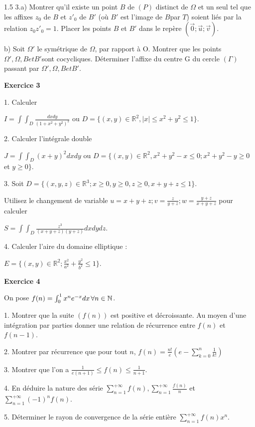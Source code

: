 \documentclass[12pt]{article}
\begin{document}
\begin{spacing}{1.5}
3.a) Montrer qu'il existe un point $B$ de $(P)$ distinct de $\Omega$ et un seul 
tel que les affixes $z_0$ de $B$ et $z'_0$ de $B'$ (où $B'$ est l'image de $B $par $T$) soient liés par la relation $z_0z'_0 = 1$. Placer les points $B$ et $B'$ dans le repère $(\overrightarrow{0} ; \overrightarrow{u}; \overrightarrow{v})$. 

b) Soit $\Omega'$ le symétrique de $\Omega$, par rapport à O. Montrer que les points $\Omega',\Omega,B et B' $sont cocycliques. 
Déterminer l'affixe du centre G du cercle $(\Gamma)$ passant par $\Omega', \Omega, B et B'$. 

\medskip\textbf{Exercice 3 }

1. Calculer

$I=\int\int_D\frac{dxdy}{(1+x^2+y^2)^2}$ ou $D=\lbrace {(x,y) \in \mathbb{R}^2,\vert x\vert \leq x^2+y^2\leq 1\rbrace}$.

2. Calculer l'intégrale double

$J=\int\int_D(x+y)^2dxdy$ ou $D=\lbrace (x,y)\in \mathbb{R}^2, x^2+y^2-x \leq 0;x^2+y^2-y \geq 0$ et $y \geq 0 \rbrace$.

3. Soit $D=\lbrace (x,y,z)\in \mathbb{R}^3;x\geq 0,y\geq 0,z\geq 0,x+y+z\leq 1 \rbrace$.

Utilisez le changement de variable $u=x+y+z; v=\frac{z}{y+z}; w=\frac{y+z}{x+y+z}$ pour calculer

$S=\int\int_D\frac{z^3}{(x+y+z)(y+z)}dxdydz$.

4. Calculer l'aire du domaine elliptique :

$E = \lbrace (x,y)\in \mathbb{R}^2;\frac{x^2}{a^2}+\frac{y^2}{b^2}\leq 1\rbrace$.


\medskip\textbf{Exercice 4 }

On pose $f(n)=\int_{0}^{1}x^ne^{-x}dx \hspace{0.05cm} \forall n\in \mathbb{N}$.

1. Montrer que la suite $(f(n))$ est positive et décroissante. Au moyen d'une intégration par parties
 donner une relation de récurrence entre $f(n)$ et $f(n-1)$.
 
 2. Montrer par récurrence que pour tout $n$,  $f(n)= \frac{n!}{e}(e-\sum_{k=0}^{n}\frac{1}{k!})$
 
 3. Montrer que l'on a $\frac{1}{e(n+1)}\leq f(n)\leq \frac{1}{n+1}$.
 
 4. En déduire la nature des série $\sum_{n=1}^{+\infty}f(n), \sum_{n=1}^{+\infty}\frac{f(n)}{n}$ et $\sum_{n=1}^{+\infty}(-1)^nf(n)$.
 
 5. Déterminer le rayon de convergence de la série entière $\sum_{n=1}^{+\infty}f(n)x^n$.
 

\end{spacing}
\end{document}
